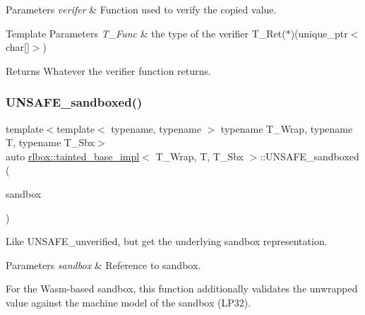 \begin{DoxyParams}{Parameters}
{\em verifer} & Function used to verify the copied value. \\
\hline
\end{DoxyParams}

\begin{DoxyTemplParams}{Template Parameters}
{\em T\+\_\+\+Func} & the type of the verifier {\ttfamily T\+\_\+\+Ret($\ast$)(unique\+\_\+ptr$<$char\mbox{[}\mbox{]}$>$)} \\
\hline
\end{DoxyTemplParams}
\begin{DoxyReturn}{Returns}
Whatever the verifier function returns. 
\end{DoxyReturn}
\mbox{\label{classrlbox_1_1tainted__base__impl_ae2c69129cbb9344e7d2623129f031214}} 
\subsubsection{\texorpdfstring{U\+N\+S\+A\+F\+E\+\_\+sandboxed()}{UNSAFE\_sandboxed()}}
{\footnotesize\ttfamily template$<$template$<$ typename, typename $>$ typename T\+\_\+\+Wrap, typename T, typename T\+\_\+\+Sbx$>$ \\
auto \hyperlink{classrlbox_1_1tainted__base__impl}{rlbox\+::tainted\+\_\+base\+\_\+impl}$<$ T\+\_\+\+Wrap, T, T\+\_\+\+Sbx $>$\+::U\+N\+S\+A\+F\+E\+\_\+sandboxed (\begin{DoxyParamCaption}\item[{\hyperlink{classrlbox_1_1rlbox__sandbox}{rlbox\+\_\+sandbox}$<$ T\+\_\+\+Sbx $>$ \&}]{sandbox }\end{DoxyParamCaption})\hspace{0.3cm}{\ttfamily [inline]}}



Like U\+N\+S\+A\+F\+E\+\_\+unverified, but get the underlying sandbox representation. 


\begin{DoxyParams}{Parameters}
{\em sandbox} & Reference to sandbox.\\
\hline
\end{DoxyParams}
For the Wasm-\/based sandbox, this function additionally validates the unwrapped value against the machine model of the sandbox (L\+P32). \mbox{\label{classrlbox_1_1tainted__base__impl_a1292132a467d30150be6d4e2b72ff6b2}} 
